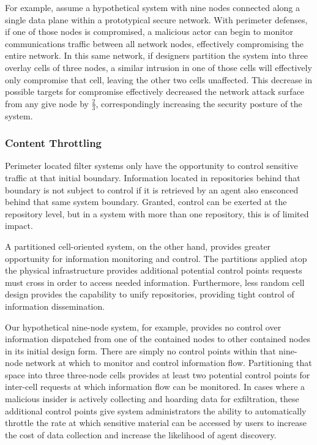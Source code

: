 For example, assume a hypothetical system with nine nodes connected along a single data plane within a prototypical secure network.  With perimeter defenses, if one of those nodes is compromised, a malicious actor can begin to monitor communications traffic between all network nodes, effectively compromising the entire network.  In this same network, if designers partition the system into three overlay cells of three nodes, a similar intrusion in one of those cells will effectively only compromise that cell, leaving the other two cells unaffected.  This decrease in possible targets for compromise effectively decreased the network attack surface from any give node by $\frac{2}{3}$, correspondingly increasing the security posture of the system.

\subsubsection*{Content Throttling}
Perimeter located filter systems only have the opportunity to control sensitive traffic at that initial boundary.  Information located in repositories behind that boundary is not subject to control if it is retrieved by an agent also ensconced behind that same system boundary.  Granted, control can be exerted at the repository level, but in a system with more than one repository, this is of limited impact.

A partitioned cell-oriented system, on the other hand, provides greater opportunity for information monitoring and control.  The partitions applied atop the physical infrastructure provides additional potential control points requests must cross in order to access needed information.  Furthermore, less random cell design provides the capability to unify repositories, providing tight control of information dissemination.

Our hypothetical nine-node system, for example, provides no control over information dispatched from one of the contained nodes to other contained nodes in its initial design form.  There are simply no control points within that nine-node network at which to monitor and control information flow.  Partitioning that space into three three-node cells provides at least two potential control points for inter-cell requests at which information flow can be monitored.  In cases where a malicious insider is actively collecting and hoarding data for exfiltration, these additional control points give system administrators the ability to automatically throttle the rate at which sensitive material can be accessed by users to increase the cost of data collection and increase the likelihood of agent discovery.

